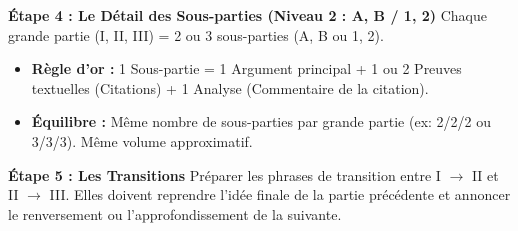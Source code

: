 \documentclass[11pt]{article}
\begin{document}
\begin{methode}
\textbf{Étape 4 : Le Détail des Sous-parties (Niveau 2 : A, B / 1, 2)}
Chaque grande partie (I, II, III) = 2 ou 3 sous-parties (A, B ou 1, 2).
\begin{itemize}
    \item \textbf{Règle d'or :} 1 Sous-partie = 1 Argument principal + 1 ou 2 Preuves textuelles (Citations) + 1 Analyse (Commentaire de la citation).
    \item \textbf{Équilibre :} Même nombre de sous-parties par grande partie (ex: 2/2/2 ou 3/3/3). Même volume approximatif.
\end{itemize}

\textbf{Étape 5 : Les Transitions}
Préparer les phrases de transition entre I $\to$ II et II $\to$ III. Elles doivent reprendre l'idée finale de la partie précédente et annoncer le renversement ou l'approfondissement de la suivante.
\end{methode}
\end{document}

